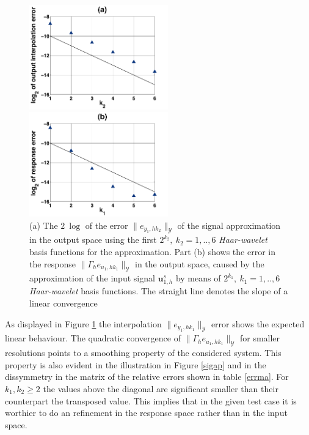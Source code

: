 \documentclass[a4paper,10pt,BCOR=15mm]{scrbook}
\providecommand{\norm}[1]{\lVert#1 \rVert}
\begin{document}
\begin{figure}[htbp]
  \centering
  \begin{minipage}[b]{6 cm}
    \includegraphics[width=6cm]{pics/numex/outintplot.pdf}  
  \end{minipage}
  \begin{minipage}[b]{6 cm}
    \includegraphics[width=6cm]{pics/numex/resperplot.pdf}  
  \end{minipage}
  \caption{(a) The $2~\log$ of the error $\norm{e_{y_1,hk_2}}_{\mathcal Y}$ of the signal approximation in the output space using the first $2^{k_2},~k_2=1,..,6$ \textit{Haar-wavelet} basis functions for the approximation. Part (b) shows the error in the response $\norm {\Gamma _he_{u_1,hk_1}}_{\mathcal Y}$ in the output space, caused by the approximation of the input signal $\mathbf u^s_{1,h}$ by means of $2^{k_1},~k_1=1,..,6$ \textit{Haar-wavelet} basis functions. The straight line denotes the slope of a linear convergence}
  \label{sigapcon}
\end{figure}

As displayed in Figure \ref{sigapcon} the interpolation $\norm{e_{y_1,hk_1}}_{\mathcal Y}$ error shows the expected linear behaviour. The quadratic convergence of $\norm {\Gamma _he_{u_1,hk_1}}_{\mathcal Y}$ for smaller resolutions points to a smoothing property of the considered system. This property is also evident in the illustration in Figure \ref{sigap} and in the dissymmetry in the matrix of the relative errors shown in table \ref{errma}. For $k_{1},k_{2} \geq 2$ the values above the diagonal are significant smaller than their counterpart the transposed value. This implies that in the given test case it is worthier to do an refinement in the response space rather than in the input space. 
\end{document}
